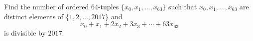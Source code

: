 Find the number of ordered $64$-tuples $\{x_0,x_1,\dots,x_{63}\}$ such that $x_0,x_1,\dots,x_{63}$ are distinct elements of $\{1,2,\dots,2017\}$ and
\[x_0+x_1+2x_2+3x_3+\cdots+63x_{63}\]is divisible by $2017.$